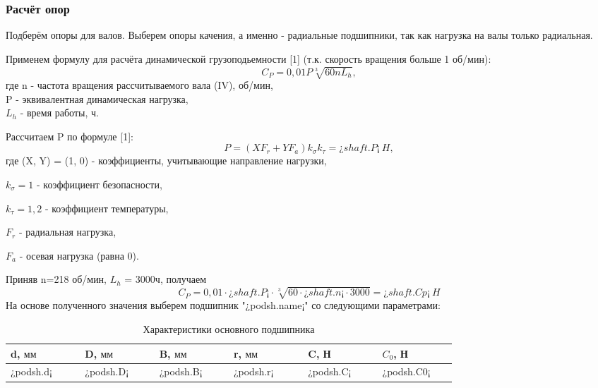 \documentclass[14pt,a4paper,russian]{scrartcl}
\begin{document}
    \subsubsection{Расчёт опор}
        Подберём опоры для валов. Выберем опоры качения, а именно - радиальные подшипники,
        так как нагрузка на валы только радиальная.\par
        Применем формулу для расчёта динамической грузоподьемности [1] (т.к. скорость вращения
        больше 1 об/мин):
        \[ C_P = 0,01P\sqrt[3]{60nL_h}, \]
        где n - частота вращения рассчитываемого вала (IV), об/мин, \\P - эквивалентная
        динамическая нагрузка,\\ \( L_h \) - время работы, ч.\par
        Рассчитаем P по формуле [1]:
        \[ P = (XF_r + YF_a)k_\sigma k_\tau = ¿shaft.P¡\ H, \]
        где (X, Y) = (1, 0) - коэффициенты, учитывающие направление нагрузки,\par
            \( k_\sigma = 1 \) - коэффициент безопасности,\par
            \( k_\tau=1,2 \) - коэффициент температуры,\par
            \( F_r \) - радиальная нагрузка, \par
            \( F_a \) - осевая нагрузка (равна 0).\par
        Приняв n=218 об/мин, \( L_h \) = 3000ч, получаем
        \[ C_P = 0,01\cdot ¿shaft.P¡ \cdot \sqrt[3]{60\cdot ¿shaft.n¡\cdot 3000} = ¿shaft.Cp¡\ H \]
        \cite{Dorf}
        На основе полученного значения выберем подшипник "¿podsh.name¡" со следующими
        параметрами:
        \begin{table}[h!]
            \begin{center}
                \begin{tabular}{p{0.13\linewidth}p{0.13\linewidth}p{0.13\linewidth}p{0.13\linewidth}p{0.13\linewidth}p{0.13\linewidth}}
                    \hline
                    d, \( \text{мм} \) & D, \( \text{мм} \) & B, \( \text{мм} \) & r, \( \text{мм} \) & C, Н & \( C_0 \), Н \\
                    \hline
                    ¿podsh.d¡ & ¿podsh.D¡ & ¿podsh.B¡ & ¿podsh.r¡ & ¿podsh.C¡ & ¿podsh.C0¡ \\
                    \hline
                \end{tabular}
                \caption{{Характеристики основного подшипника}}\label{tab:podsh}
            \end{center}
        \end{table}
\end{document}
